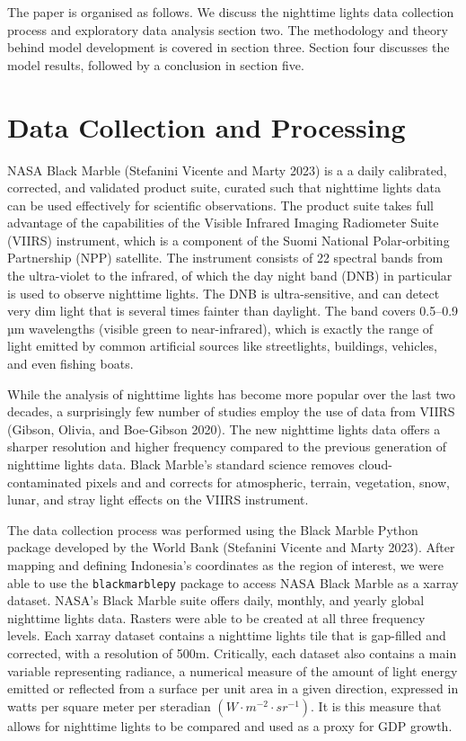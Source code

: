 \documentclass[
]{interact}
\begin{document}
The paper is organised as follows. We discuss the nighttime lights data
collection process and exploratory data analysis section two. The
methodology and theory behind model development is covered in section
three. Section four discusses the model results, followed by a
conclusion in section five.

\section{Data Collection and
Processing}\label{data-collection-and-processing}

NASA Black Marble (Stefanini Vicente and Marty 2023) is a a daily
calibrated, corrected, and validated product suite, curated such that
nighttime lights data can be used effectively for scientific
observations. The product suite takes full advantage of the capabilities
of the Visible Infrared Imaging Radiometer Suite (VIIRS) instrument,
which is a component of the Suomi National Polar-orbiting Partnership
(NPP) satellite. The instrument consists of 22 spectral bands from the
ultra-violet to the infrared, of which the day night band (DNB) in
particular is used to observe nighttime lights. The DNB is
ultra-sensitive, and can detect very dim light that is several times
fainter than daylight. The band covers 0.5--0.9 µm wavelengths (visible
green to near-infrared), which is exactly the range of light emitted by
common artificial sources like streetlights, buildings, vehicles, and
even fishing boats.

While the analysis of nighttime lights has become more popular over the
last two decades, a surprisingly few number of studies employ the use of
data from VIIRS (Gibson, Olivia, and Boe-Gibson 2020). The new nighttime
lights data offers a sharper resolution and higher frequency compared to
the previous generation of nighttime lights data. Black Marble's
standard science removes cloud-contaminated pixels and and corrects for
atmospheric, terrain, vegetation, snow, lunar, and stray light effects
on the VIIRS instrument.

The data collection process was performed using the Black Marble Python
package developed by the World Bank (Stefanini Vicente and Marty 2023).
After mapping and defining Indonesia's coordinates as the region of
interest, we were able to use the \texttt{blackmarblepy} package to
access NASA Black Marble as a xarray dataset. NASA's Black Marble suite
offers daily, monthly, and yearly global nighttime lights data. Rasters
were able to be created at all three frequency levels. Each xarray
dataset contains a nighttime lights tile that is gap-filled and
corrected, with a resolution of 500m. Critically, each dataset also
contains a main variable representing radiance, a numerical measure of
the amount of light energy emitted or reflected from a surface per unit
area in a given direction, expressed in watts per square meter per
steradian \((W \cdot m^{-2} \cdot sr^{-1})\). It is this measure that
allows for nighttime lights to be compared and used as a proxy for GDP
growth.
\end{document}
